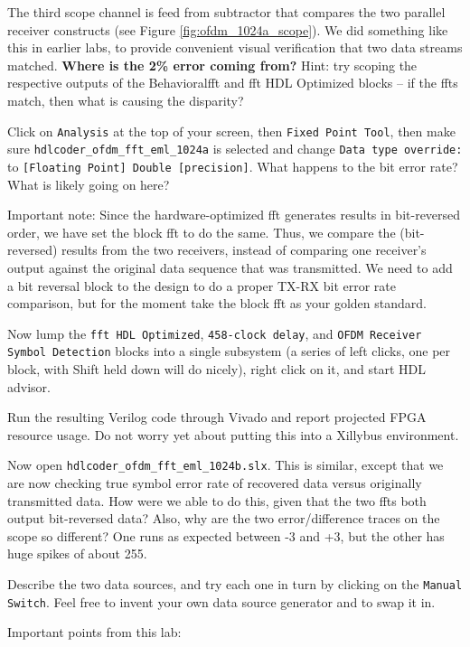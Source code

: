 The third scope channel is feed from subtractor that compares the two parallel receiver constructs (see Figure \ref{fig:ofdm_1024a_scope}). We did something like this in earlier labs, to provide convenient visual verification that two data streams matched. \textbf{Where is the 2\% error coming from?} Hint: try scoping the respective outputs of the Behavioral\gls{fft} and \gls{fft} HDL Optimized blocks -- if the \gls{fft}s match, then what is causing the disparity?
 
Click on \texttt{Analysis} at the top of your screen, then \texttt{Fixed Point Tool}, then make sure \texttt{hdlcoder\_ofdm\_fft\_eml\_1024a} is selected and change \texttt{Data type override:} to \texttt{[Floating Point] Double [precision]}. What happens to the bit error rate? What is likely going on here?

Important note: Since the hardware-optimized \gls{fft} generates results in bit-reversed order, we have set the block \gls{fft} to do the same. Thus, we compare the (bit-reversed) results from the two receivers, instead of comparing one receiver's output against the original data sequence that was transmitted. We need to add a bit reversal block to the design to do a proper TX-RX bit error rate comparison, but for the moment take the block \gls{fft} as your golden standard.
 
Now lump the \texttt{\gls{fft} HDL Optimized}, \texttt{458-clock delay}, and \texttt{OFDM Receiver Symbol Detection} blocks into a single subsystem (a series of left clicks, one per block, with Shift held down will do nicely), right click on it, and start HDL advisor.
 
Run the resulting Verilog code through Vivado and report projected FPGA resource usage. Do not worry yet about putting this into a Xillybus environment.
 
Now open \texttt{hdlcoder\_ofdm\_fft\_eml\_1024b.slx}. This is similar, except that we are now checking true symbol error rate of recovered data versus originally transmitted data. How were we able to do this, given that the two \gls{fft}s both output bit-reversed data? Also, why are the two error/difference traces on the scope so different? One runs as expected between -3 and +3, but the other has huge spikes of about 255.
 
Describe the two data sources, and try each one in turn by clicking on the \texttt{Manual Switch}. Feel free to invent your own data source generator and to swap it in.  

Important points from this lab:
 
